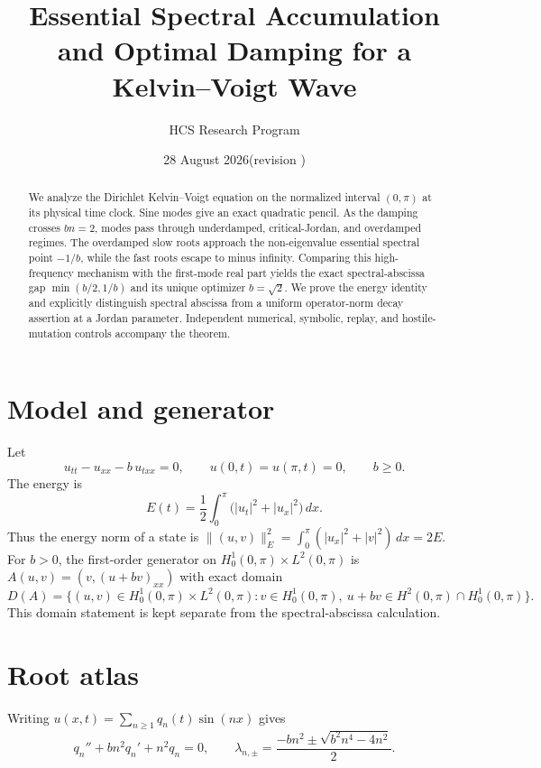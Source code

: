 \documentclass[11pt]{article}
\title{Essential Spectral Accumulation and Optimal Damping for a Kelvin--Voigt Wave}
\author{HCS Research Program}
\date{28 August 2026\quad (revision \CRevisionRound)}
\begin{document}
\maketitle
\begin{abstract}
We analyze the Dirichlet Kelvin--Voigt equation on the normalized interval
\((0,\pi)\) at its physical time clock.  Sine modes give an exact quadratic
pencil.  As the damping crosses \(bn=2\), modes pass through underdamped,
critical-Jordan, and overdamped regimes.  The overdamped slow roots approach
the non-eigenvalue essential spectral point \(-1/b\), while the fast roots
escape to minus infinity.  Comparing this high-frequency mechanism with the
first-mode real part yields the exact spectral-abscissa gap
\(\min(b/2,1/b)\) and its unique optimizer \(b=\sqrt 2\).  We prove the
energy identity and explicitly distinguish spectral abscissa from a uniform
operator-norm decay assertion at a Jordan parameter.  Independent numerical,
symbolic, replay, and hostile-mutation controls accompany the theorem.
\end{abstract}

\section{Model and generator}
Let
\[
 u_{tt}-u_{xx}-b\,u_{txx}=0,\qquad
 u(0,t)=u(\pi,t)=0,\qquad b\geq0 .
\]
The energy is
\[
 E(t)=\frac12\int_0^\pi \bigl(|u_t|^2+|u_x|^2\bigr)\,dx .
\]
Thus the energy norm of a state is
\(\|(u,v)\|_E^2=\int_0^\pi(|u_x|^2+|v|^2)\,dx=2E\).
For \(b>0\), the first-order generator on
\(H_0^1(0,\pi)\times L^2(0,\pi)\) is
\(A(u,v)=(v,(u+bv)_{xx})\) with exact domain
\[
D(A)=\{(u,v)\in H_0^1(0,\pi)\times L^2(0,\pi):v\in H_0^1(0,\pi),\
u+bv\in H^2(0,\pi)\cap H_0^1(0,\pi)\}.
\]
This domain statement is kept separate from the spectral-abscissa
calculation.

\section{Root atlas}
Writing \(u(x,t)=\sum_{n\ge1}q_n(t)\sin(nx)\) gives
\[
 q_n''+bn^2q_n'+n^2q_n=0,\qquad
 \lambda_{n,\pm}=\frac{-bn^2\pm\sqrt{b^2n^4-4n^2}}2 .
\]
\end{document}
